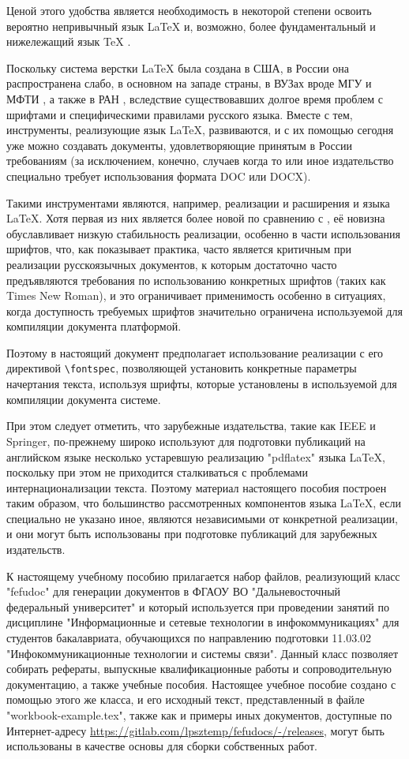 \documentclass[workbook]{fefudoc}
\begin{document}
Ценой этого удобства является необходимость в некоторой степени освоить вероятно непривычный язык \LaTeX{} и, возможно, более фундаментальный  и нижележащий язык \TeX{} \cite{TheTexBook}.

Поскольку система верстки \LaTeX{} была создана в США, в России она распространена слабо, в основном на западе страны, в ВУЗах вроде МГУ и МФТИ \cite{ctan-disser-mipt}, а также в РАН \cite{RAS-latex}, вследствие существовавших долгое время проблем с шрифтами и специфическими правилами русского языка.
Вместе с тем, инструменты, реализующие язык \LaTeX{}, развиваются, и с их помощью сегодня уже можно создавать документы, удовлетворяющие принятым в России требованиям (за исключением, конечно, случаев когда то или иное издательство специально требует использования формата DOC или DOCX).

Такими инструментами являются, например, реализации и расширения \LuaLaTeX{} и \XeLaTeX{} языка \LaTeX{}.
Хотя первая из них является более новой по сравнению с \XeLaTeX{}, её новизна обуславливает низкую стабильность реализации, особенно в части использования шрифтов, что, как показывает практика, часто является критичным при реализации русскоязычных документов, к которым достаточно часто предъявляются требования по использованию конкретных шрифтов (таких как Times New Roman), и это ограничивает применимость \LuaLaTeX{} особенно в ситуациях, когда доступность требуемых шрифтов значительно ограничена используемой для компиляции документа платформой.

Поэтому в настоящий документ предполагает использование реализации \XeLaTeX{} с его директивой \verb+\fontspec+, позволяющей установить конкретные параметры начертания текста, используя шрифты, которые установлены в используемой для компиляции документа системе.

При этом следует отметить, что зарубежные издательства, такие как IEEE и Springer, по-прежнему широко используют для подготовки публикаций на английском языке несколько устаревшую реализацию "pdflatex" языка \LaTeX{}, поскольку при этом не приходится сталкиваться с проблемами интернационализации текста.
Поэтому материал настоящего пособия построен таким образом, что большинство рассмотренных компонентов языка \LaTeX{}, если специально не указано иное, являются независимыми от конкретной реализации, и они могут быть использованы при подготовке публикаций для зарубежных издательств.

К настоящему учебному пособию прилагается набор файлов, реализующий класс "fefudoc" для генерации документов в ФГАОУ ВО "Дальневосточный федеральный университет" и который используется при проведении занятий по дисциплине "Информационные и сетевые технологии в инфокоммуникациях" для студентов бакалавриата, обучающихся по направлению подготовки 11.03.02 "Инфокоммуникационные технологии и системы связи".
Данный класс позволяет собирать рефераты, выпускные квалификационные работы и сопроводительную документацию, а также учебные пособия.
Настоящее учебное пособие создано с помощью этого же класса, и его исходный текст, представленный в файле "workbook-example.tex", также как и примеры иных документов, доступные по Интернет-адресу \url{https://gitlab.com/lpsztemp/fefudocs/-/releases}, могут быть использованы в качестве основы для сборки собственных работ.
\end{document}

